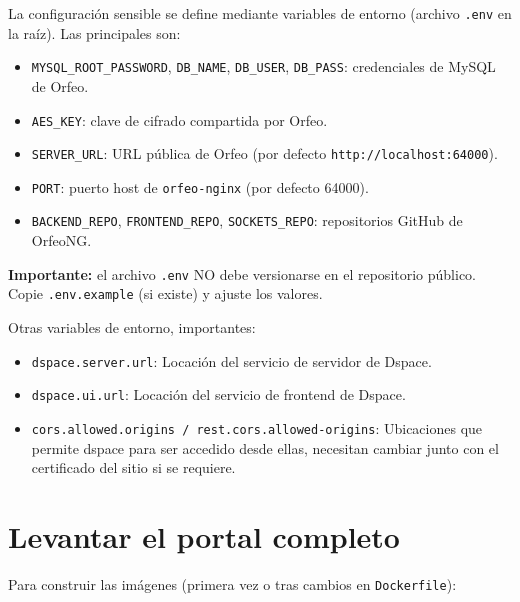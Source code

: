 \documentclass[12pt,a4paper]{report}
\begin{document}
La configuración sensible se define mediante variables de entorno (archivo
\texttt{.env} en la raíz). Las principales son:

\begin{itemize}
  \item \texttt{MYSQL\_ROOT\_PASSWORD}, \texttt{DB\_NAME}, \texttt{DB\_USER},
        \texttt{DB\_PASS}: credenciales de MySQL de Orfeo.
  \item \texttt{AES\_KEY}: clave de cifrado compartida por Orfeo.
  \item \texttt{SERVER\_URL}: URL pública de Orfeo (por defecto
        \texttt{http://localhost:64000}).
  \item \texttt{PORT}: puerto host de \texttt{orfeo-nginx} (por defecto 64000).
  \item \texttt{BACKEND\_REPO}, \texttt{FRONTEND\_REPO},
        \texttt{SOCKETS\_REPO}: repositorios GitHub de OrfeoNG.
\end{itemize}

\begin{mdframed}[style=importantstyle]
  \textbf{Importante:} el archivo \texttt{.env} NO debe versionarse en el
  repositorio público. Copie \texttt{.env.example} (si existe) y ajuste los
  valores.
\end{mdframed}

Otras variables de entorno, importantes:

\begin{itemize}
  \item \texttt{dspace.server.url}: Locación del servicio de servidor de Dspace. 
    \item \texttt{dspace.ui.url}: Locación del servicio de frontend de Dspace. 
    \item \texttt{cors.allowed.origins / rest.cors.allowed-origins}: Ubicaciones que permite dspace para ser accedido desde ellas, necesitan cambiar junto con el certificado del sitio si se requiere.
\end{itemize}



\section{Levantar el portal completo}


Para construir las imágenes (primera vez o tras cambios en \texttt{Dockerfile}):

\end{document}
